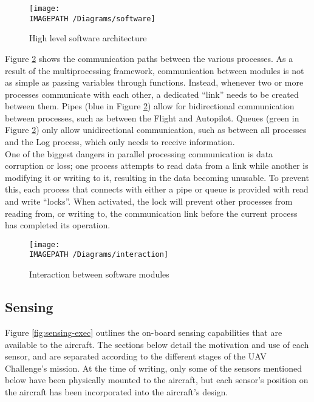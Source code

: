 \begin{figure}[!ht]
	\centering
	\texttt{[image: \\IMAGEPATH /Diagrams/software]}
	\caption{High level software architecture}
	\label{fig:softwarearchitecture-exec}
\end{figure}

Figure \ref{fig:softwareinteraction-exec} shows the communication paths between the various processes. As a result of the multiprocessing framework, communication between modules is not as simple as passing variables through functions. Instead, whenever two or more processes communicate with each other, a dedicated ``link'' needs to be created between them. Pipes (blue in Figure \ref{fig:softwareinteraction-exec}) allow for bidirectional communication between processes, such as between the Flight and Autopilot. Queues (green in Figure \ref{fig:softwareinteraction-exec}) only allow unidirectional communication, such as between all processes and the Log process, which only needs to receive information.\\

One of the biggest dangers in parallel processing communication is data corruption or loss; one process attempts to read data from a link while another is modifying it or writing to it, resulting in the data becoming unusable. To prevent this, each process that connects with either a pipe or queue is provided with read and write ``locks''. When activated, the lock will prevent other processes from reading from, or writing to, the communication link before the current process has completed its operation.

\begin{figure}[H]
	\centering
	\texttt{[image: \\IMAGEPATH /Diagrams/interaction]}
	\caption{Interaction between software modules}
	\label{fig:softwareinteraction-exec}
\end{figure}

\subsection{Sensing}

Figure \ref{fig:sensing-exec} outlines the on-board sensing capabilities that are available to the aircraft. The sections below detail the motivation and use of each sensor, and are separated according to the different stages of the UAV Challenge's mission. At the time of writing, only some of the sensors mentioned below have been physically mounted to the aircraft, but each sensor's position on the aircraft has been incorporated into the aircraft's design.


